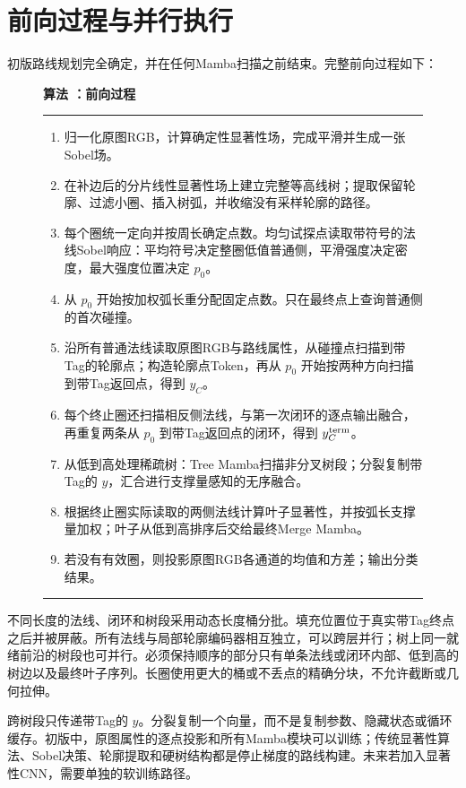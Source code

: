 \section{前向过程与并行执行}
\label{sec:algorithm}

初版路线规划完全确定，并在任何Mamba扫描之前结束。完整前向过程如下：

\begin{figure}[t]
\label{alg:topocontour}
\small
\noindent\textbf{算法 \thealgorithm：\method{}前向过程}
\vspace{2pt}\hrule\vspace{3pt}
\begin{enumerate}[label=\arabic*.,leftmargin=1.5em,itemsep=1.5pt]
    \item 归一化原图RGB，计算确定性显著性场，完成平滑并生成一张Sobel场。
    \item 在补边后的分片线性显著性场上建立完整等高线树；提取保留轮廓、过滤小圈、插入树弧，并收缩没有采样轮廓的路径。
    \item 每个圈统一定向并按周长确定点数。均匀试探点读取带符号的法线Sobel响应：平均符号决定整圈低值普通侧，平滑强度决定密度，最大强度位置决定 $p_0$。
    \item 从 $p_0$ 开始按加权弧长重分配固定点数。只在最终点上查询普通侧的首次碰撞。
    \item 沿所有普通法线读取原图RGB与路线属性，从碰撞点扫描到带Tag的轮廓点；构造轮廓点Token，再从 $p_0$ 开始按两种方向扫描到带Tag返回点，得到 $y_C$。
    \item 每个终止圈还扫描相反侧法线，与第一次闭环的逐点输出融合，再重复两条从 $p_0$ 到带Tag返回点的闭环，得到 $y_C^{\rm term}$。
    \item 从低到高处理稀疏树：Tree Mamba扫描非分叉树段；分裂复制带Tag的 $y$，汇合进行支撑量感知的无序融合。
    \item 根据终止圈实际读取的两侧法线计算叶子显著性，并按弧长支撑量加权；叶子从低到高排序后交给最终Merge Mamba。
    \item 若没有有效圈，则投影原图RGB各通道的均值和方差；输出分类结果。
\end{enumerate}
\vspace{2pt}\hrule
\end{figure}

不同长度的法线、闭环和树段采用动态长度桶分批。填充位置位于真实带Tag终点之后并被屏蔽。所有法线与局部轮廓编码器相互独立，可以跨层并行；树上同一就绪前沿的树段也可并行。必须保持顺序的部分只有单条法线或闭环内部、低到高的树边以及最终叶子序列。长圈使用更大的桶或不丢点的精确分块，不允许截断或几何拉伸。

跨树段只传递带Tag的 $y$。分裂复制一个向量，而不是复制参数、隐藏状态或循环缓存。初版中，原图属性的逐点投影和所有Mamba模块可以训练；传统显著性算法、Sobel决策、轮廓提取和硬树结构都是停止梯度的路线构建。未来若加入显著性CNN，需要单独的软训练路径。
